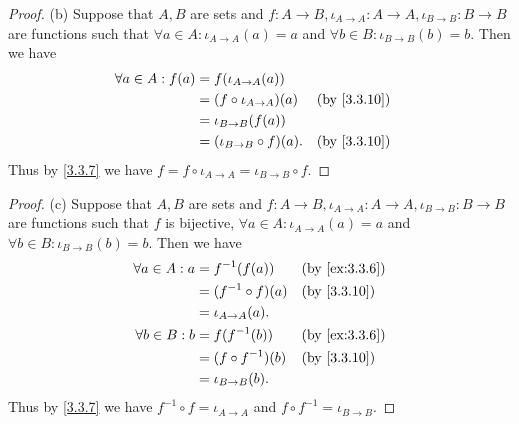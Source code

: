 \begin{proof}{(b)}
  Suppose that \(A, B\) are sets and \(f : A \to B, \iota_{A \to A} : A \to A, \iota_{B \to B} : B \to B\) are functions such that \(\forall a \in A : \iota_{A \to A}(a) = a\) and \(\forall b \in B : \iota_{B \to B}(b) = b\).
  Then we have
  \begin{align*}
    \forall a \in A : f(a) & = f(\iota_{A \to A}(a))                                        \\
                           & = (f \circ \iota_{A \to A})(a)  &  & \text{(by \cref{3.3.10})} \\
                           & = \iota_{B \to B}(f(a))                                        \\
                           & = (\iota_{B \to B} \circ f)(a). &  & \text{(by \cref{3.3.10})}
  \end{align*}
  Thus by \cref{3.3.7} we have \(f = f \circ \iota_{A \to A} = \iota_{B \to B} \circ f\).
\end{proof}

\begin{proof}{(c)}
  Suppose that \(A, B\) are sets and \(f : A \to B, \iota_{A \to A} : A \to A, \iota_{B \to B} : B \to B\) are functions such that \(f\) is bijective, \(\forall a \in A : \iota_{A \to A}(a) = a\) and \(\forall b \in B : \iota_{B \to B}(b) = b\).
  Then we have
  \begin{align*}
    \forall a \in A : a & = f^{-1}(f(a))        &  & \text{(by \cref{ex:3.3.6})} \\
                        & = (f^{-1} \circ f)(a) &  & \text{(by \cref{3.3.10})}   \\
                        & = \iota_{A \to A}(a).                                  \\
    \forall b \in B : b & = f(f^{-1}(b))        &  & \text{(by \cref{ex:3.3.6})} \\
                        & = (f \circ f^{-1})(b) &  & \text{(by \cref{3.3.10})}   \\
                        & = \iota_{B \to B}(b).
  \end{align*}
  Thus by \cref{3.3.7} we have \(f^{-1} \circ f = \iota_{A \to A}\) and \(f \circ f^{-1} = \iota_{B \to B}\).
\end{proof}


